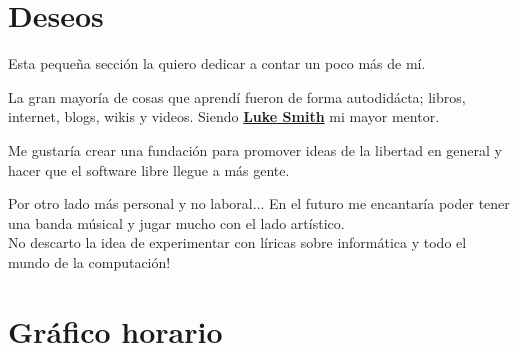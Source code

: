 \documentclass[%
               doublesided,
               paper=a4,
               fontsize=10pt
              ]{my-resume}
\begin{document}
{    \section{Deseos}
    Esta pequeña sección la quiero dedicar a contar un poco más de mí.

    \medskip
    La gran mayoría de cosas que aprendí fueron de forma autodidácta; libros, internet, blogs, wikis y videos. 
    Siendo \textbf{\href{https://lukesmith.xyz/}{Luke Smith}} mi mayor mentor.

    \medskip
    Me gustaría crear una fundación para promover ideas de la libertad en general y hacer que el software libre llegue a más gente.

    \medskip
    Por otro lado más personal y no laboral... En el futuro me encantaría poder tener una banda músical y jugar mucho con el lado artístico.\\
    No descarto la idea de experimentar con líricas sobre informática y todo el mundo de la computación!

    \section{Gráfico horario}
}
\makebody
\end{document}
